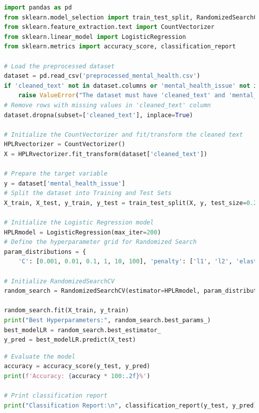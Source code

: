 \begin{tcolorbox}[colback=gray!5!white, colframe=gray!80!black, boxrule=0.5pt, title=Logistic Regression]
\begin{lstlisting}[language=Python]
import pandas as pd
from sklearn.model_selection import train_test_split, RandomizedSearchCV
from sklearn.feature_extraction.text import CountVectorizer
from sklearn.linear_model import LogisticRegression
from sklearn.metrics import accuracy_score, classification_report

# Load the preprocessed dataset
dataset = pd.read_csv('preprocessed_mental_health.csv')
if 'cleaned_text' not in dataset.columns or 'mental_health_issue' not in dataset.columns:
    raise ValueError("The dataset must have 'cleaned_text' and 'mental_health_issue' columns.")
# Remove rows with missing values in 'cleaned_text' column
dataset.dropna(subset=['cleaned_text'], inplace=True)

# Initialize the CountVectorizer and fit/transform the cleaned text
HPLRvectorizer = CountVectorizer()
X = HPLRvectorizer.fit_transform(dataset['cleaned_text'])

# Prepare the target variable
y = dataset['mental_health_issue']
# Split the dataset into Training and Test Sets
X_train, X_test, y_train, y_test = train_test_split(X, y, test_size=0.2, random_state=42)

# Initialize the Logistic Regression model
HPLRmodel = LogisticRegression(max_iter=200)
# Define the hyperparameter grid for Randomized Search
param_distributions = {
    'C': [0.001, 0.01, 0.1, 1, 10, 100], 'penalty': ['l1', 'l2', 'elasticnet', 'none'], 'solver': ['liblinear', 'saga']}

# Initialize RandomizedSearchCV
random_search = RandomizedSearchCV(estimator=HPLRmodel, param_distributions=param_distributions, n_iter=10, scoring='accuracy', cv=5, n_jobs=-1, random_state=42)

random_search.fit(X_train, y_train)
print("Best Hyperparameters:", random_search.best_params_)
best_modelLR = random_search.best_estimator_
y_pred = best_modelLR.predict(X_test)
\end{lstlisting}
\end{tcolorbox}

\begin{tcolorbox}[colback=gray!5!white, colframe=gray!80!black, boxrule=0.5pt, title=Logistic Regression]
    \begin{lstlisting}[language=Python]
# Evaluate the model
accuracy = accuracy_score(y_test, y_pred)
print(f'Accuracy: {accuracy * 100:.2f}%')

# Print classification report
print("Classification Report:\n", classification_report(y_test, y_pred))
\end{lstlisting}
\end{tcolorbox}


